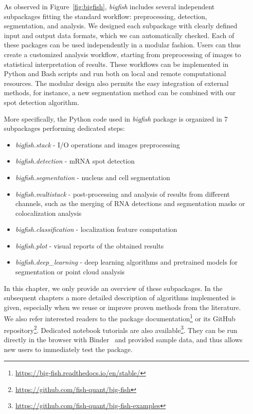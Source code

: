 As observed in Figure~\ref{fig:bigfish}, \emph{bigfish} includes several independent subpackages fitting the standard workflow: preprocessing, detection, segmentation, and analysis.
We designed each subpackage with clearly defined input and output data formats, which we can automatically checked.
Each of these packages can be used independently in a modular fashion.
Users can thus create a customized analysis workflow, starting from preprocessing of images to statistical interpretation of results.
These workflows can be implemented in Python and Bash scripts and run both on local and remote computational resources.
The modular design also permits the easy integration of external methods, for instance, a new segmentation method can be combined with our spot detection algorithm.

More specifically, the Python code used in \emph{bigfish} package is organized in 7 subpackages performing dedicated steps:
\begin{itemize}
	\setlength\itemsep{0.1em}
	\item \emph{bigfish.stack} - I/O operations and images preprocessing
	\item \emph{bigfish.detection} - \ac{mRNA} spot detection
	\item \emph{bigfish.segmentation} - nucleus and cell segmentation
	\item \emph{bigfish.multistack} - post-processing and analysis of results from different channels, such as the merging of \ac{RNA} detections and segmentation masks or colocalization analysis
	\item \emph{bigfish.classification} - localization feature computation
	\item \emph{bigfish.plot} - visual reports of the obtained results
	\item \emph{bigfish.deep\_learning} - deep learning algorithms and pretrained models for segmentation or point cloud analysis
\end{itemize}

In this chapter, we only provide an overview of these subpackages.
In the subsequent chapters a more detailed description of algorithms implemented is given, especially when we reuse or improve proven methods from the literature.
We also refer interested readers to the package documentation\footnote{\url{https://big-fish.readthedocs.io/en/stable/}} or its GitHub repository\footnote{\url{https://github.com/fish-quant/big-fish}}.
Dedicated notebook tutorials are also available\footnote{\url{https://github.com/fish-quant/big-fish-examples}}.
They can be run directly in the browser with Binder~\cite{Jupyter2018Binder2} and provided sample data, and thus allows new users to immediately test the package.

